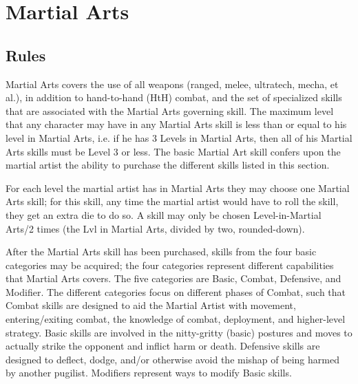 \documentclass[twoside]{book}
\begin{document}
    

\chapter{Martial Arts}
    
    

\section{Rules}
    
    {  
      Martial Arts covers the use of all weapons (ranged,
             melee, ultratech, mecha, et al.), in addition to
             hand-to-hand (HtH) combat, and the set of specialized skills
             that are associated with the Martial Arts governing skill.
             The maximum level that any character may have in any Martial
             Arts skill is less than or equal to his level in Martial
             Arts, i.e. if he has 3 Levels in Martial Arts, then all of
             his Martial Arts skills must be Level 3 or less. The basic
             Martial Art skill confers upon the martial artist the
             ability to purchase the different skills listed in this
             section. 
    }
  
    {  
      For each level the martial artist has in Martial Arts
             they may choose one Martial Arts skill; for this skill, any
             time the martial artist would have to roll the skill, they
             get an extra die to do so. A skill may only be chosen
             Level-in-Martial Arts/2 times (the Lvl in Martial Arts,
             divided by two, rounded-down). 
    }
  
  

  

  
    {  
      After the Martial Arts skill has been purchased,
             skills from the four basic categories may be acquired; the
             four categories represent different capabilities that
             Martial Arts covers. The five categories are Basic, Combat,
             Defensive, and Modifier. The different categories focus on
             different phases of Combat, such that Combat skills are
             designed to aid the Martial Artist with movement,
             entering/exiting combat, the knowledge of combat,
             deployment, and higher-level strategy. Basic skills are
             involved in the nitty-gritty (basic) postures and moves to
             actually strike the opponent and inflict harm or death.
             Defensive skills are designed to deflect, dodge, and/or
             otherwise avoid the mishap of being harmed by another
             pugilist. Modifiers represent ways to modify Basic skills.
             
    }
  
\end{document}
